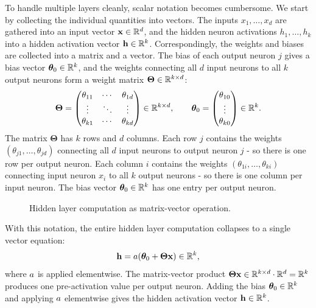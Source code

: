 To handle multiple layers cleanly, scalar notation becomes cumbersome. We start by collecting the individual quantities into vectors. The inputs $x_1, \ldots, x_d$ are gathered into an input vector $\mathbf{x} \in \mathbb{R}^d$, and the hidden neuron activations $h_1, \ldots, h_k$ into a hidden activation vector $\mathbf{h} \in \mathbb{R}^k$. Correspondingly, the weights and biases are collected into a matrix and a vector. The bias of each output neuron $j$ gives a bias vector $\boldsymbol{\theta}_0 \in \mathbb{R}^k$, and the weights connecting all $d$ input neurons to all $k$ output neurons form a weight matrix $\boldsymbol{\Theta} \in \mathbb{R}^{k \times d}$:
\begin{equation}
\boldsymbol{\Theta} =
\begin{pmatrix}
\theta_{11} & \cdots & \theta_{1d} \\
\vdots & \ddots & \vdots \\
\theta_{k1} & \cdots & \theta_{kd}
\end{pmatrix}
\in \mathbb{R}^{k \times d}, \qquad
\boldsymbol{\theta}_0 =
\begin{pmatrix} \theta_{10} \\ \vdots \\ \theta_{k0} \end{pmatrix}
\in \mathbb{R}^k.
\end{equation}
The matrix $\boldsymbol{\Theta}$ has $k$ rows and $d$ columns. Each row $j$ contains the weights $(\theta_{j1}, \ldots, \theta_{jd})$ connecting all $d$ input neurons to output neuron $j$ - so there is one row per output neuron. Each column $i$ contains the weights $(\theta_{1i}, \ldots, \theta_{ki})$ connecting input neuron $x_i$ to all $k$ output neurons - so there is one column per input neuron. The bias vector $\boldsymbol{\theta}_0 \in \mathbb{R}^k$ has one entry per output neuron.

\begin{figure}
\centering
{}
\resizebox{0.33\textwidth}{!}{}
\caption{Hidden layer computation as matrix-vector operation.}
\label{fig:matrix_vector_multiply}
\end{figure}

With this notation, the entire hidden layer computation collapses to a single vector equation:
\begin{equation}
\mathbf{h} = a\!\left(\boldsymbol{\theta}_0 + \boldsymbol{\Theta}\mathbf{x}\right) \in \mathbb{R}^k,
\label{eq:layer_matrix}
\end{equation}
where $a$ is applied elementwise. The matrix-vector product $\boldsymbol{\Theta}\mathbf{x} \in \mathbb{R}^{k \times d} \cdot \mathbb{R}^d = \mathbb{R}^k$ produces one pre-activation value per output neuron. Adding the bias $\boldsymbol{\theta}_0 \in \mathbb{R}^k$ and applying $a$ elementwise gives the hidden activation vector $\mathbf{h} \in \mathbb{R}^k$.

